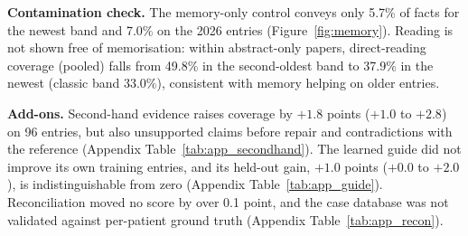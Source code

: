 \documentclass{article} %
\begin{document}
\textbf{Contamination check.}\label{sec:memory} The memory-only control conveys only 5.7\% of facts for the newest band and 7.0\% on the 2026 entries (Figure~\ref{fig:memory}). Reading is not shown free of memorisation: within abstract-only papers, direct-reading coverage (pooled) falls from 49.8\% in the second-oldest band to 37.9\% in the newest (classic band 33.0\%), consistent with memory helping on older entries.

\textbf{Add-ons.}\label{sec:addons} Second-hand evidence raises coverage by $+1.8$ points ($+1.0$ to $+2.8$) on 96 entries, but also unsupported claims before repair and contradictions with the reference (Appendix Table~\ref{tab:app_secondhand}). The learned guide did not improve its own training entries, and its held-out gain, $+1.0$ points ($+0.0$ to $+2.0$), is indistinguishable from zero (Appendix Table~\ref{tab:app_guide}). Reconciliation moved no score by over 0.1 point, and the case database was not validated against per-patient ground truth (Appendix Table~\ref{tab:app_recon}).
\end{document}

